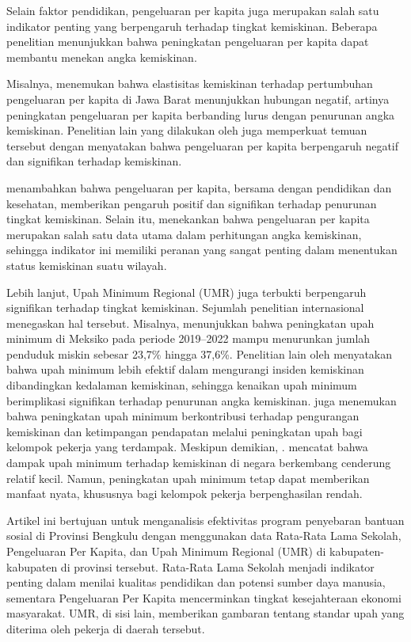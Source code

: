 \documentclass{article}
\begin{document}
Selain faktor pendidikan, pengeluaran per kapita juga merupakan salah satu indikator penting yang berpengaruh terhadap tingkat kemiskinan. Beberapa penelitian menunjukkan bahwa peningkatan pengeluaran per kapita dapat membantu menekan angka kemiskinan. 

Misalnya, \cite{muttaqin2025elastisitas} menemukan bahwa elastisitas kemiskinan terhadap pertumbuhan pengeluaran per kapita di Jawa Barat menunjukkan hubungan negatif, artinya peningkatan pengeluaran per kapita berbanding lurus dengan penurunan angka kemiskinan. Penelitian lain yang dilakukan oleh \cite{siregar2023analisis} juga memperkuat temuan tersebut dengan menyatakan bahwa pengeluaran per kapita berpengaruh negatif dan signifikan terhadap kemiskinan. 

\cite{rabbani2025analisis} menambahkan bahwa pengeluaran per kapita, bersama dengan pendidikan dan kesehatan, memberikan pengaruh positif dan signifikan terhadap penurunan tingkat kemiskinan. Selain itu, \cite{nugroho2020leading} menekankan bahwa pengeluaran per kapita merupakan salah satu data utama dalam perhitungan angka kemiskinan, sehingga indikator ini memiliki peranan yang sangat penting dalam menentukan status kemiskinan suatu wilayah.


Lebih lanjut, Upah Minimum Regional (UMR) juga terbukti berpengaruh signifikan terhadap tingkat kemiskinan. Sejumlah penelitian internasional menegaskan hal tersebut. Misalnya,\cite{munguia2024minimum} menunjukkan bahwa peningkatan upah minimum di Meksiko pada periode 2019–2022 mampu menurunkan jumlah penduduk miskin sebesar 23,7\% hingga 37,6\%. Penelitian lain oleh \cite{dantas2025non} menyatakan bahwa upah minimum lebih efektif dalam mengurangi insiden kemiskinan dibandingkan kedalaman kemiskinan, sehingga kenaikan upah minimum berimplikasi signifikan terhadap penurunan angka kemiskinan. \cite{alaniz2011impact} juga menemukan bahwa peningkatan upah minimum berkontribusi terhadap pengurangan kemiskinan dan ketimpangan pendapatan melalui peningkatan upah bagi kelompok pekerja yang terdampak. Meskipun demikian, \cite{bassier2024can}. mencatat bahwa dampak upah minimum terhadap kemiskinan di negara berkembang cenderung relatif kecil. Namun, peningkatan upah minimum tetap dapat memberikan manfaat nyata, khususnya bagi kelompok pekerja berpenghasilan rendah.


Artikel ini bertujuan untuk menganalisis efektivitas program penyebaran bantuan sosial di Provinsi Bengkulu dengan menggunakan data Rata-Rata Lama Sekolah, Pengeluaran Per Kapita, dan Upah Minimum Regional (UMR) di kabupaten-kabupaten di provinsi tersebut. Rata-Rata Lama Sekolah menjadi indikator penting dalam menilai kualitas pendidikan dan potensi sumber daya manusia, sementara Pengeluaran Per Kapita mencerminkan tingkat kesejahteraan ekonomi masyarakat. UMR, di sisi lain, memberikan gambaran tentang standar upah yang diterima oleh pekerja di daerah tersebut.
\end{document}
